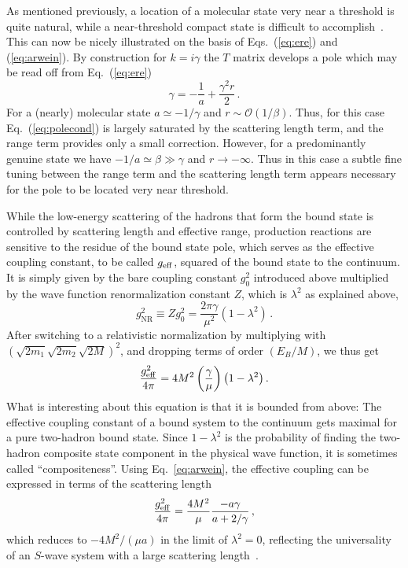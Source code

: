  
 

 As mentioned previously, a location of a molecular state very near a threshold
 is quite natural, while a near-threshold compact state is
 difficult to accomplish~\cite{Jaffe:2007id,Hanhart:2014ssa}. This can now be 
 nicely illustrated on the basis of Eqs.~(\ref{eq:ere}) and (\ref{eq:arwein}). 
 By construction for $k=i\gamma$ the $T$ matrix develops a pole which may be
 read off from Eq.~(\ref{eq:ere})
 \begin{equation}
 \gamma = -\frac{1}{a} + \frac{\gamma^2 r}{2} \, .
 \label{eq:polecond}
 \end{equation}
 For a (nearly) molecular state $a\simeq -1/\gamma$ and $r\sim {\mathcal
 O}(1/\beta)$. Thus, for this case Eq.~(\ref{eq:polecond}) is largely saturated 
 by the scattering length term, and the range term provides only a small
 correction. However, for a predominantly genuine state we have $-1/a\simeq 
 \beta \gg \gamma$ and $r\to -\infty$. Thus in this case a subtle fine tuning 
 between the range term and the scattering length term appears necessary for the
 pole to be located very near threshold.


 While the low-energy scattering of the hadrons that form the bound state is
 controlled by scattering length and effective range, production reactions are
 sensitive to the residue of the bound state pole, which serves as the effective
 coupling constant,  to be called $g_{\rm eff}$, squared of the bound state to
 the continuum.  It is simply given by the bare coupling constant $g_0^2$
 introduced above multiplied by the wave function renormalization constant $Z$,
 which is $\lambda^2$  as explained above,
\begin{equation}
  g_\text{NR}^2\equiv{Z} g_0^2   = \frac{2\pi\gamma}{\mu^2} (1-\lambda^2) \, .
  \label{eq:residue_bs}
\end{equation}
 After switching to a relativistic normalization by multiplying
 with  $\left(\sqrt{2m_1}\sqrt{2m_2}\sqrt{2M}\right)^2$, and
 dropping terms of order $(E_B/M)$, we thus get
 \begin{equation}
 \frac{g_{\rm eff}^2}{4\pi}= 4 M^2\left(\frac{\gamma}{\mu}\right) 
 \left(1-\lambda^2\right)  .
 \label{eq:residue}
 \end{equation}
What is interesting about this equation is that it is bounded from above: The
effective coupling constant of a bound system to the continuum gets maximal for 
a pure two-hadron bound state. Since $1-\lambda^2$ is the probability of finding
the two-hadron composite state component in the physical wave function, it is
sometimes called ``compositeness''. Using Eq.~\eqref{eq:arwein}, the effective
coupling can be expressed in terms of the scattering length
\begin{equation}
  \frac{g_{\rm eff}^2}{4\pi}= \frac{4 M^2}{\mu}\frac{{-a\gamma}}{a+2/\gamma}\,,
  \label{eq:ga}
\end{equation}
which reduces to $-4M^2/(\mu a)$ in the limit of $\lambda^2=0$, reflecting the 
universality of an $S$-wave system with a large scattering 
length~\cite{Braaten:2004rn}.

